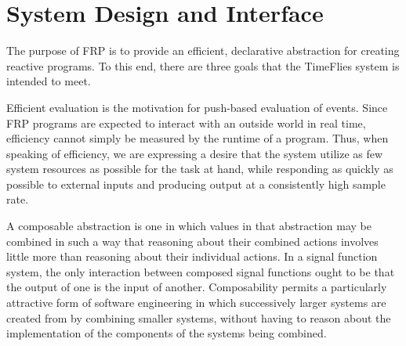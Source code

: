 
\section{System Design and Interface}
\label{section:System_Design_and_Interface}

The purpose of FRP is to provide an efficient, declarative abstraction for creating
reactive programs. To this end, there are three goals that the TimeFlies
system is intended to meet. 

Efficient evaluation is the motivation for push-based evaluation of events.
Since FRP programs are expected to  interact with an outside world in real time,
efficiency cannot simply be measured by the runtime of a program. Thus, when speaking of efficiency,
we are expressing a desire that the system utilize as few system resources as possible
for the task at hand, while responding as quickly as possible to external inputs and
producing output at a consistently high sample rate.


A composable abstraction is one in which values in that abstraction may be
combined in such a way that reasoning about their combined actions involves
little more than reasoning about their individual actions. In a signal function
system, the only interaction between composed signal functions ought to be that
the output of one is the input of another. Composability permits a particularly
attractive form of software engineering in which successively larger systems are
created from by combining smaller systems, without having to reason about the 
implementation of the components of the systems being combined.


